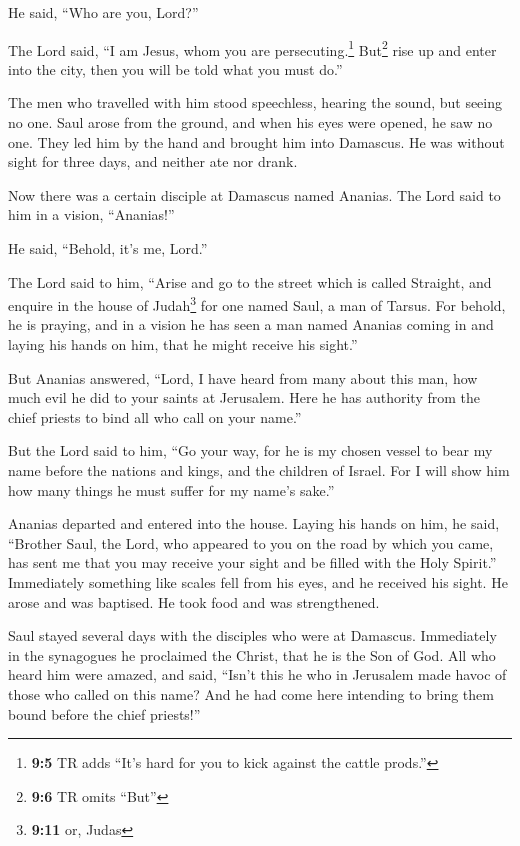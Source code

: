  He said, ``Who are you, Lord?''

The Lord said, ``I am Jesus, whom you are persecuting.\footnote{\textbf{9:5}
  TR adds ``It's hard for you to kick against the cattle prods.''}
 But\footnote{\textbf{9:6} TR omits ``But''} rise up and
enter into the city, then you will be told what you must do.''

 The men who travelled with him stood speechless, hearing
the sound, but seeing no one.  Saul arose from the ground,
and when his eyes were opened, he saw no one. They led him by the hand
and brought him into Damascus.  He was without sight for
three days, and neither ate nor drank.

 Now there was a certain disciple at Damascus named
Ananias. The Lord said to him in a vision, ``Ananias!''

He said, ``Behold, it's me, Lord.''

 The Lord said to him, ``Arise and go to the street which
is called Straight, and enquire in the house of Judah\footnote{\textbf{9:11}
  or, Judas} for one named Saul, a man of Tarsus. For behold, he is
praying,  and in a vision he has seen a man named Ananias
coming in and laying his hands on him, that he might receive his
sight.''

 But Ananias answered, ``Lord, I have heard from many
about this man, how much evil he did to your saints at Jerusalem.
 Here he has authority from the chief priests to bind all
who call on your name.''

 But the Lord said to him, ``Go your way, for he is my
chosen vessel to bear my name before the nations and kings, and the
children of Israel.  For I will show him how many things
he must suffer for my name's sake.''

 Ananias departed and entered into the house. Laying his
hands on him, he said, ``Brother Saul, the Lord, who appeared to you on
the road by which you came, has sent me that you may receive your sight
and be filled with the Holy Spirit.''  Immediately
something like scales fell from his eyes, and he received his sight. He
arose and was baptised.  He took food and was
strengthened.

Saul stayed several days with the disciples who were at Damascus.
 Immediately in the synagogues he proclaimed the Christ,
that he is the Son of God.  All who heard him were
amazed, and said, ``Isn't this he who in Jerusalem made havoc of those
who called on this name? And he had come here intending to bring them
bound before the chief priests!''

